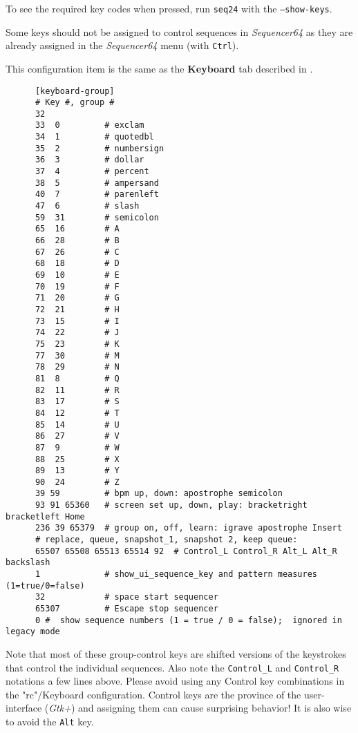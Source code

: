   To see the required key codes when pressed, run \texttt{seq24} with
   the \texttt{--show-keys}.

   Some keys should not be assigned to control sequences in
   \textsl{Sequencer64} as they are already assigned in the
   \textsl{Sequencer64} menu (with \texttt{Ctrl}). 

   This configuration item is the same as the 
   \textbf{Keyboard} tab described in
   .

   \begin{verbatim}
      [keyboard-group]
      # Key #, group # 
      32
      33  0         # exclam
      34  1         # quotedbl
      35  2         # numbersign
      36  3         # dollar
      37  4         # percent
      38  5         # ampersand
      40  7         # parenleft
      47  6         # slash
      59  31        # semicolon
      65  16        # A
      66  28        # B
      67  26        # C
      68  18        # D
      69  10        # E
      70  19        # F
      71  20        # G
      72  21        # H
      73  15        # I
      74  22        # J
      75  23        # K
      77  30        # M
      78  29        # N
      81  8         # Q
      82  11        # R
      83  17        # S
      84  12        # T
      85  14        # U
      86  27        # V
      87  9         # W
      88  25        # X
      89  13        # Y
      90  24        # Z
      39 59         # bpm up, down: apostrophe semicolon
      93 91 65360   # screen set up, down, play: bracketright bracketleft Home
      236 39 65379  # group on, off, learn: igrave apostrophe Insert
      # replace, queue, snapshot_1, snapshot 2, keep queue:
      65507 65508 65513 65514 92  # Control_L Control_R Alt_L Alt_R backslash
      1             # show_ui_sequence_key and pattern measures (1=true/0=false)
      32            # space start sequencer
      65307         # Escape stop sequencer
      0 #  show sequence numbers (1 = true / 0 = false);  ignored in legacy mode
   \end{verbatim}

   Note that most of these group-control keys are shifted versions of the
   keystrokes that control the individual sequences.  Also note the
   \texttt{Control\_L} and \texttt{Control\_R} notations a few lines above.
   Please avoid using any Control key combinations in the "rc"/Keyboard
   configuration.  Control keys are the province of the user-interface
   (\textsl{Gtk+}) and assigning them can cause surprising behavior!
   It is also wise to avoid the \texttt{Alt} key.

